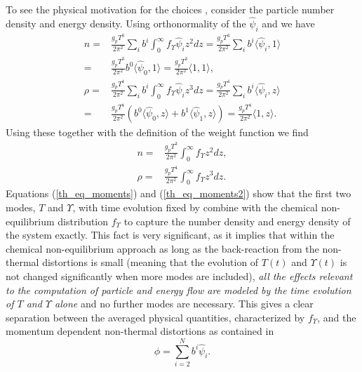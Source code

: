 To see the physical motivation for the choices , consider the particle number density and energy density.  Using orthonormality of the $\hat\psi_i$ and  we have
\begin{align}
n=&\frac{g_pT^3}{2\pi^2}\sum_ib^i\int_0^\infty f_\Upsilon  \hat\psi_i z^2 dz=\frac{g_pT^3}{2\pi^2}\sum_ib^i\langle \hat\psi_i ,1\rangle\\
=&\frac{g_pT^3}{2\pi^2}b^0\langle \hat\psi_0 ,1\rangle=\frac{g_pT^3}{2\pi^2}\langle 1 ,1\rangle,\\
\rho=&\frac{g_pT^4}{2\pi^2}\sum_ib^i\int_0^\infty f_\Upsilon  \hat\psi_i z^3 dz=\frac{g_pT^4}{2\pi^2}\sum_ib^i\langle\hat\psi_i, z\rangle\\
=&\frac{g_pT^4}{2\pi^2}\left(b^0\langle\hat\psi_0, z\rangle+b^1\langle\hat\psi_1, z\rangle\right)=
\frac{g_pT^4}{2\pi^2}\langle 1,z\rangle.
\end{align}
 Using these together with the definition of the weight function  we find
\begin{align}\label{th_eq_moments}
n=&\frac{g_pT^3}{2\pi^2}\int_0^\infty f_\Upsilon  z^2dz,\\
\label{th_eq_moments2}
\rho=&\frac{g_pT^4}{2\pi^2}\int_0^\infty f_\Upsilon  z^3dz.
\end{align}
Equations (\ref{th_eq_moments}) and (\ref{th_eq_moments2}) show  that the first two modes, $T$ and $\Upsilon$, with time evolution fixed by  combine with the chemical non-equilibrium distribution $f_\Upsilon $ to capture the number density and energy density of the system exactly.  This fact is very significant, as it implies that within the chemical non-equilibrium approach as long as the back-reaction from the non-thermal distortions is small (meaning that the evolution of $T(t)$ and $\Upsilon(t)$ is not changed significantly when more modes are included), {\em all the effects relevant to the computation of  particle and energy flow are modeled by the time evolution of $T$ and $\Upsilon$ alone} and no further modes are necessary.  This gives a clear separation between the averaged physical quantities, characterized by $f_\Upsilon $, and the momentum dependent non-thermal distortions as contained in 
\begin{equation}
\phi=\sum_{i=2}^N b^i\hat\psi_i.
\end{equation}

